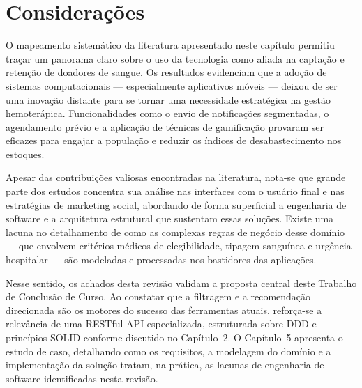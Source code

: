 \section{Considerações}

O mapeamento sistemático da literatura apresentado neste capítulo permitiu traçar um panorama claro sobre o uso da tecnologia como aliada na captação e retenção de doadores de sangue. Os resultados evidenciam que a adoção de sistemas computacionais --- especialmente aplicativos móveis --- deixou de ser uma inovação distante para se tornar uma necessidade estratégica na gestão hemoterápica. Funcionalidades como o envio de notificações segmentadas, o agendamento prévio e a aplicação de técnicas de gamificação provaram ser eficazes para engajar a população e reduzir os índices de desabastecimento nos estoques.

Apesar das contribuições valiosas encontradas na literatura, nota-se que grande parte dos estudos concentra sua análise nas interfaces com o usuário final e nas estratégias de marketing social, abordando de forma superficial a engenharia de software e a arquitetura estrutural que sustentam essas soluções. Existe uma lacuna no detalhamento de como as complexas regras de negócio desse domínio --- que envolvem critérios médicos de elegibilidade, tipagem sanguínea e urgência hospitalar --- são modeladas e processadas nos bastidores das aplicações.

Nesse sentido, os achados desta revisão validam a proposta central deste Trabalho de Conclusão de Curso. Ao constatar que a filtragem e a recomendação direcionada são os motores do sucesso das ferramentas atuais, reforça-se a relevância de uma RESTful API especializada, estruturada sobre DDD e princípios SOLID conforme discutido no Capítulo~2. O Capítulo~5 apresenta o estudo de caso, detalhando como os requisitos, a modelagem do domínio e a implementação da solução tratam, na prática, as lacunas de engenharia de software identificadas nesta revisão.
